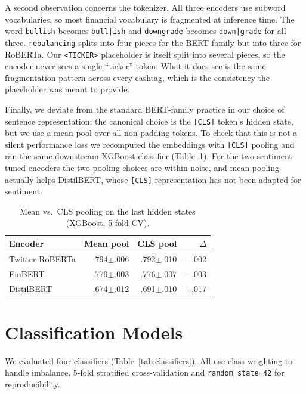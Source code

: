 \documentclass[12pt,a4paper]{article}
\begin{document}
A second observation concerns the tokenizer. All three encoders use subword vocabularies, so most financial vocabulary is fragmented at inference time. The word \texttt{bullish} becomes \texttt{bull|ish} and \texttt{downgrade} becomes \texttt{down|grade} for all three. \texttt{rebalancing} splits into four pieces for the BERT family but into three for RoBERTa. Our \texttt{<TICKER>} placeholder is itself split into several pieces, so the encoder never sees a single ``ticker'' token. What it does see is the same fragmentation pattern across every cashtag, which is the consistency the placeholder was meant to provide.

Finally, we deviate from the standard BERT-family practice in our choice of sentence representation: the canonical choice is the \texttt{[CLS]} token's hidden state, but we use a mean pool over all non-padding tokens. To check that this is not a silent performance loss we recomputed the embeddings with \texttt{[CLS]} pooling and ran the same downstream XGBoost classifier (Table~\ref{tab:pooling}). For the two sentiment-tuned encoders the two pooling choices are within noise, and mean pooling actually helps DistilBERT, whose \texttt{[CLS]} representation has not been adapted for sentiment.

\begin{table}[!htbp]
\centering
\begin{tabular}{lrrr}
\toprule
\textbf{Encoder} & \textbf{Mean pool} & \textbf{CLS pool} & \textbf{$\Delta$} \\
\midrule
Twitter-RoBERTa & .794$\pm$.006 & .792$\pm$.010 & $-$.002 \\
FinBERT         & .779$\pm$.003 & .776$\pm$.007 & $-$.003 \\
DistilBERT      & .674$\pm$.012 & .691$\pm$.010 & $+$.017 \\
\bottomrule
\end{tabular}
\caption{Mean vs.\ CLS pooling on the last hidden states (XGBoost, 5-fold CV).}
\label{tab:pooling}
\end{table}

\section{Classification Models}
\label{sec:models}

We evaluated four classifiers (Table~\ref{tab:classifiers}). All use class weighting to handle imbalance, 5-fold stratified cross-validation and \texttt{random\_state=42} for reproducibility.
\end{document}
